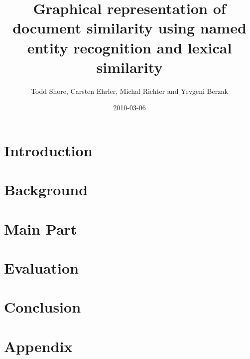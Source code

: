 \documentclass[12pt]{article}
\title{Graphical representation of document similarity using named entity recognition and lexical similarity}
\author{Todd Shore, Carsten Ehrler, Michal Richter and Yevgeni Berzak}
\date{2010-03-06}
\begin{document}
\ifpdf
{}
\else
{}
\fi

\maketitle
\tableofcontents

\begin{abstract}
\end{abstract}


\section{Introduction} %
\label{sec:introduction}



\section{Background} %
\label{sec:background}



\section{Main Part}
\label{sec:main_part}



\section{Evaluation}
\label{sec:evaluation}



\section{Conclusion}
\label{sec:conclusion}



\section{Appendix}



\end{document}
